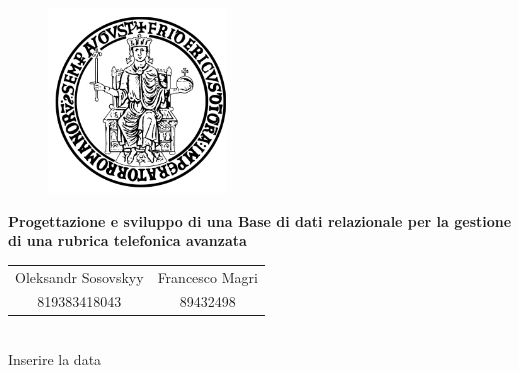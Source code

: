 \documentclass[a4paper,11pt]{report}
\begin{document}
\begin{figure}[htbp!]
\begin{center}
\includegraphics[width=.35\textwidth]{Immagini/FedericoII.png}
\end{center}
\end{figure}

\begin{center}
{\Huge\bfseries\noindent 
Progettazione e sviluppo di una Base di dati relazionale per la gestione di una rubrica telefonica avanzata}
\end{center}  
    
\begin{center}
\begin{tabular}{cc}
Oleksandr Sosovskyy & Francesco Magri \\
819383418043 & 89432498\\
\end{tabular}
\\
Inserire la data
\end{center}

\newpage

\tableofcontents
    



\end{document}
